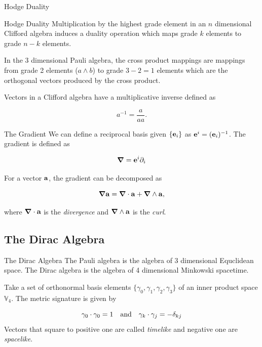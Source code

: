 \documentclass{beamer}
\begin{document}
\begin{frame}{Hodge Duality}
\begin{alertblock}{Hodge Duality}
	Multiplication by the highest grade element in an $n$ dimensional Clifford algebra induces a duality operation which maps grade $k$ elements to grade $n-k$ elements.
\end{alertblock}

\pause

In the 3 dimensional Pauli algebra, the cross product mappings are mappings from grade 2 elements ($a \wedge b$) to grade $3-2 = 1$ elements which are the orthogonal vectors produced by the cross product.

\pause

Vectors in a Clifford algebra have a multiplicative inverse defined as

\begin{equation}
	a^{-1} = \frac{a}{aa}.
\end{equation}

\end{frame}

\begin{frame}{The Gradient}
We can define a reciprocal basis given $\{\vb e_i\}$ as $\vb e^i = (\vb e_i)^{-1}$. The gradient is defined as

\begin{equation*}
	\grad = \vb e^i \partial_i
\end{equation*}
\pause

For a vector $\vb a$, the gradient can be decomposed as

\begin{equation*}
	\grad \vb a = \grad \cdot \vb a + \grad \wedge \vb a,
\end{equation*}

where $\grad \cdot \vb a$ is the \emph{divergence} and $\grad \wedge \vb a$ is the \emph{curl}.

\end{frame}

\subsection{The Dirac Algebra}

\begin{frame}{The Dirac Algebra}
The Pauli algebra is the algebra of 3 dimensional Equclidean space. The Dirac algebra is the algebra of 4 dimensional Minkowski spacetime.
\pause

Take a set of orthonormal basis elements $\{\gamma_0, \gamma_1, \gamma_2, \gamma_3\}$ of an inner product space $\mathbb{V}_4$. The metric signature is given by

\begin{equation*}
	\gamma_0\cdot\gamma_0 = 1 \qq{and} \gamma_k\cdot \gamma_j = -\delta_{kj}
\end{equation*}
Vectors that square to positive one are called \emph{timelike} and negative one are \emph{spacelike}.


\end{frame}
\end{document}
